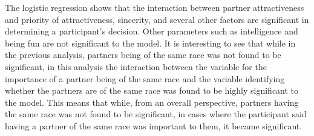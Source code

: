 \documentclass{article}
\begin{document}
The logistic regression shows that the interaction between partner attractiveness and priority of attractiveness, sincerity, and several other factors are significant in determining a participant's decision.  Other parameters such as intelligence and being fun are not significant to the model. It is interesting to see that while in the previous analysis, partners being of the same race was not found to be significant, in this analysis the interaction between the variable for the importance of a partner being of the same race and the variable identifying whether the partners are of the same race was found to be highly significant to the model. This means that while, from an overall perspective, partners having the same race was not found to be significant, in cases where the participant said having a partner of the same race was important to them, it became significant.
%
\end{document}
